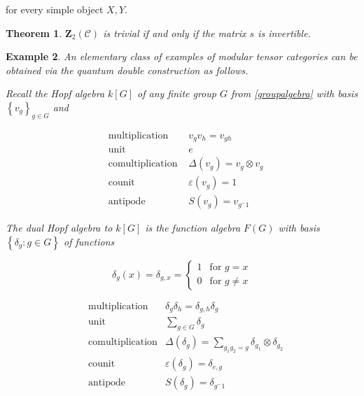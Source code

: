 \documentclass[]{article}
\newtheorem{theorem}{Theorem}[subsection]
\newtheorem{example}[theorem]{Example}
\numberwithin{equation}{subsection}
\begin{document}
for every simple object $X,Y$.

\begin{theorem}
    $\mathbf{Z}_2(\mathcal{C})$ is trivial if and only if the matrix $s$ is invertible. 
\end{theorem}

\begin{example}
    An elementary class of examples of modular tensor categories can be obtained via the quantum double construction as follows. 


    Recall the Hopf algebra $k[G]$ of any finite group $G$ from \ref{groupalgebra} with basis $\left\{ v_g \right\}_{g \in G}$ and

    \begin{align}
        &\text{multiplication }   & v_g v_h = v_{gh} \\
        &\text{unit }             & e \\
        &\text{comultiplication } & \Delta(v_g) = v_g \otimes v_g \\
        &\text{counit }           & \varepsilon(v_g) = 1 \\
        &\text{antipode }         & S(v_g) = v_{g^-1}
    \end{align}

    The dual Hopf algebra to $k[G]$ is the function algebra $F(G)$ with basis $\left\{ \delta_g : g \in G \right\}$ of functions

    \begin{equation}
        \delta_g(x) = \delta_{g,x} = \begin{cases} 1 &\text{for $g = x$} \\ 0 &\text{for $g \neq x$} \end{cases}
    \end{equation}

    \begin{align}
        &\text{multiplication} &\delta_g \delta_h = \delta_{g,h} \delta_g\\
        &\text{unit}           &\sum_{g \in G} \delta_g \\
        &\text{comultiplication} &\Delta(\delta_g) = \sum_{g_1 g_2 = g} \delta_{g_1} \otimes \delta_{g_2}\\
        &\text{counit}           &\varepsilon(\delta_g) = \delta_{e,g} \\
        &\text{antipode}         &S(\delta_g) = \delta_{g^-1}
    \end{align}



\end{example}
\end{document}
